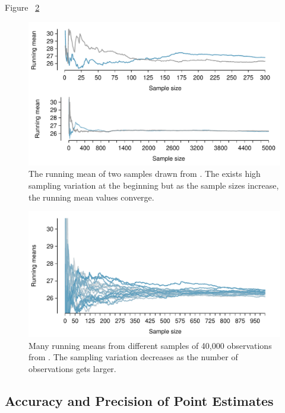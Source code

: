Figure ~\ref{runningSamplingVariation20} 
\begin{figure}
   \centering
   \includegraphics[width=\textwidth]{ch_inference_foundations_oi_biostat/figures/brfssBMISampVar/brfssBMISampVar}
   \caption{The running mean of two samples drawn from . The exists high sampling variation at the beginning but as the sample sizes increase, the running mean values converge.}
	\label{runningSamplingVariation}
\end{figure}

\begin{figure}
   \centering
   \includegraphics[width=\textwidth]{ch_inference_foundations_oi_biostat/figures/brfssBMISampVar/brfssBMISampVar20}
   \caption{Many running means from different samples of 40,000 observations from . The sampling variation decreases as the number of observations gets larger.}
	\label{runningSamplingVariation20}
\end{figure}


\subsection{Accuracy and Precision of Point Estimates}
\label{accuracyAndPrecision}


